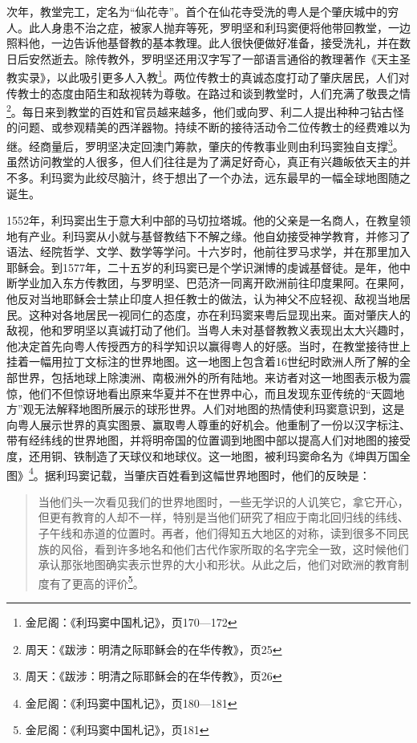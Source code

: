次年，教堂完工，定名为“仙花寺”。首个在仙花寺受洗的粤人是个肇庆城中的穷人。此人身患不治之症，被家人抛弃等死，罗明坚和利玛窦便将他带回教堂，一边照料他，一边告诉他基督教的基本教理。此人很快便做好准备，接受洗礼，并在数日后安然逝去。除传教外，罗明坚还用汉字写了一部语言通俗的教理著作《天主圣教实录》，以此吸引更多人入教\footnote{金尼阁：《利玛窦中国札记》，页170—172}。两位传教士的真诚态度打动了肇庆居民，人们对传教士的态度由陌生和敌视转为尊敬。在路过和谈到教堂时，人们充满了敬畏之情\footnote{周天：《跋涉：明清之际耶稣会的在华传教》，页25}。每日来到教堂的百姓和官员越来越多，他们或向罗、利二人提出种种刁钻古怪的问题、或参观精美的西洋器物。持续不断的接待活动令二位传教士的经费难以为继。经商量后，罗明坚决定回澳门筹款，肇庆的传教事业则由利玛窦独自支撑\footnote{周天：《跋涉：明清之际耶稣会的在华传教》，页26}。虽然访问教堂的人很多，但人们往往是为了满足好奇心，真正有兴趣皈依天主的并不多。利玛窦为此绞尽脑汁，终于想出了一个办法，远东最早的一幅全球地图随之诞生。

1552年，利玛窦出生于意大利中部的马切拉塔城。他的父亲是一名商人，在教皇领地有产业。利玛窦从小就与基督教结下不解之缘。他自幼接受神学教育，并修习了语法、经院哲学、文学、数学等学问。十六岁时，他前往罗马求学，并在那里加入耶稣会。到1577年，二十五岁的利玛窦已是个学识渊博的虔诚基督徒。是年，他中断学业加入东方传教团，与罗明坚、巴范济一同离开欧洲前往印度果阿。在果阿，他反对当地耶稣会士禁止印度人担任教士的做法，认为神父不应轻视、敌视当地居民。这种对各地居民一视同仁的态度，亦在利玛窦来粤后显现出来。面对肇庆人的敌视，他和罗明坚以真诚打动了他们。当粤人未对基督教教义表现出太大兴趣时，他决定首先向粤人传授西方的科学知识以赢得粤人的好感。当时，在教堂接待世上挂着一幅用拉丁文标注的世界地图。这一地图上包含着16世纪时欧洲人所了解的全部世界，包括地球上除澳洲、南极洲外的所有陆地。来访者对这一地图表示极为震惊，他们不但惊讶地看出原来华夏并不在世界中心，而且发现东亚传统的“天圆地方”观无法解释地图所展示的球形世界。人们对地图的热情使利玛窦意识到，这是向粤人展示世界的真实图景、赢取粤人尊重的好机会。他重制了一份以汉字标注、带有经纬线的世界地图，并将明帝国的位置调到地图中部以提高人们对地图的接受度，还用铜、铁制造了天球仪和地球仪。这一地图，被利玛窦命名为《坤舆万国全图》\footnote{金尼阁：《利玛窦中国札记》，页180—181}。据利玛窦记载，当肇庆百姓看到这幅世界地图时，他们的反映是：

\begin{quote}
当他们头一次看见我们的世界地图时，一些无学识的人讥笑它，拿它开心，但更有教育的人却不一样，特别是当他们研究了相应于南北回归线的纬线、子午线和赤道的位置时。再者，他们得知五大地区的对称，读到很多不同民族的风俗，看到许多地名和他们古代作家所取的名字完全一致，这时候他们承认那张地图确实表示世界的大小和形状。从此之后，他们对欧洲的教育制度有了更高的评价\footnote{金尼阁：《利玛窦中国札记》，页181}。

\end{quote}

